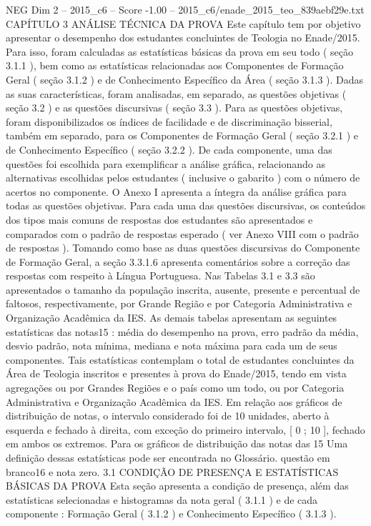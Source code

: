 \begin{textsample}{NEG Dim 2 – 2015\_c6 – Score -1.00 – 2015\_c6/enade\_2015\_teo\_839aebf29e.txt}  \label{ex:f2_neg_196}
CAPÍTULO 3 ANÁLISE TÉCNICA DA PROVA Este capítulo tem por objetivo apresentar o desempenho dos estudantes concluintes de Teologia no Enade/2015.
Para isso, foram calculadas as estatísticas básicas da prova em seu todo ( seção 3.1.1 ), bem como as estatísticas relacionadas aos Componentes de Formação Geral ( seção 3.1.2 ) e de Conhecimento Específico da Área ( seção 3.1.3 ).
Dadas as suas características, foram analisadas, em separado, as questões objetivas ( seção 3.2 ) e as questões discursivas ( seção 3.3 ).
Para as questões objetivas, foram disponibilizados os índices de facilidade e de discriminação bisserial, também em separado, para os Componentes de Formação Geral ( seção 3.2.1 ) e de Conhecimento Específico ( seção 3.2.2 ).
De cada componente, uma das questões foi escolhida para exemplificar a análise gráfica, relacionando as alternativas escolhidas pelos estudantes ( inclusive o gabarito ) com o número de acertos no componente.
O Anexo I apresenta a íntegra da análise gráfica para todas as questões objetivas.
Para cada uma das questões discursivas, os conteúdos dos tipos mais comuns de respostas dos estudantes são apresentados e comparados com o padrão de respostas esperado ( ver Anexo VIII com o padrão de respostas ).
Tomando como base as duas questões discursivas do Componente de Formação Geral, a seção 3.3.1.6 apresenta comentários sobre a correção das respostas com respeito à Língua Portuguesa.
Nas Tabelas 3.1 e 3.3 são apresentados o tamanho da população inscrita, ausente, presente e percentual de faltosos, respectivamente, por Grande Região e por Categoria Administrativa e Organização Acadêmica da IES.
As demais tabelas apresentam as seguintes estatísticas das notas15 : média do desempenho na prova, erro padrão da média, desvio padrão, nota mínima, mediana e nota máxima para cada um de seus componentes.
Tais estatísticas contemplam o total de estudantes concluintes da Área de Teologia inscritos e presentes à prova do Enade/2015, tendo em vista agregações ou por Grandes Regiões e o país como um todo, ou por Categoria Administrativa e Organização Acadêmica da IES.
Em relação aos gráficos de distribuição de notas, o intervalo considerado foi de 10 unidades, aberto à esquerda e fechado à direita, com exceção do primeiro intervalo, [ 0 ; 10 ], fechado em ambos os extremos.
Para os gráficos de distribuição das notas das 15 Uma definição dessas estatísticas pode ser encontrada no Glossário. questão em branco16 e nota zero. 3.1 CONDIÇÃO DE PRESENÇA E ESTATÍSTICAS BÁSICAS DA PROVA Esta seção apresenta a condição de presença, além das estatísticas selecionadas e histogramas da nota geral ( 3.1.1 ) e de cada componente : Formação Geral ( 3.1.2 ) e Conhecimento Específico ( 3.1.3 ).

\end{textsample}
